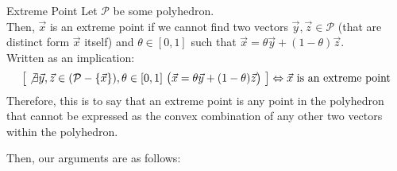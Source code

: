 \begin{ln-define}{Extreme Point}{}
    Let $\mathcal{P}$ be some polyhedron. \\
    Then, $\vec{x}$ is an extreme point if we cannot find two vectors $\vec{y}, \vec{z} \in \mathcal{P}$ (that are distinct form $\vec{x}$ itself) and $\theta \in [0, 1]$ such that $\vec{x} = \theta \vec{y} + (1 - \theta) \vec{z}$. \\
    Written as an implication:
    \[
        \big[\not\exists \vec{y}, \vec{z} \in (\mathcal{P} - \{\vec{x}\}), \theta \in [0, 1]\ \big(\vec{x} = \theta \vec{y} + (1 - \theta) \vec{z} \big)\ \big] \Leftrightarrow \vec{x} \text{ is an extreme point}
    \]
    Therefore, this is to say that an extreme point is any point in the polyhedron that cannot be expressed as the convex combination of any other two vectors within the polyhedron.
\end{ln-define}
Then, our arguments are as follows:
